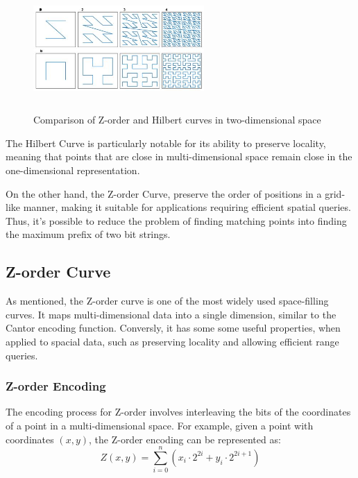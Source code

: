 
\begin{figure}[h]
    \centering
    \includegraphics[width=6.5cm,height=4.7cm]{img/hilbert-z-order.jpg}
    \caption{Comparison of Z-order and Hilbert curves in two-dimensional space}
    \label{fig:space-filling}
\end{figure}

\vspace{5mm}

The Hilbert Curve is particularly notable for its ability to preserve locality, meaning that points that are close in multi-dimensional space remain close in the one-dimensional representation.

On the other hand, the Z-order Curve, preserve the order of positions in a grid-like manner, making it suitable for applications requiring efficient spatial queries. Thus, it's possible to reduce the problem of finding matching points into finding the maximum prefix of two bit strings.

\subsection{Z-order Curve}
As mentioned, the Z-order curve is one of the most widely used space-filling curves. It maps multi-dimensional data into a single dimension, similar to the Cantor encoding function. Conversly, it has some some useful properties, when applied to spacial data, such as preserving locality and allowing efficient range queries.

\subsubsection{Z-order Encoding}

The encoding process for Z-order involves interleaving the bits of the coordinates of a point in a multi-dimensional space. For example, given a point with coordinates \( (x, y) \), the Z-order encoding can be represented as:
\[
    Z(x, y) = \sum_{i=0}^{n} (x_i \cdot 2^{2i} + y_i \cdot 2^{2i+1})
\]

